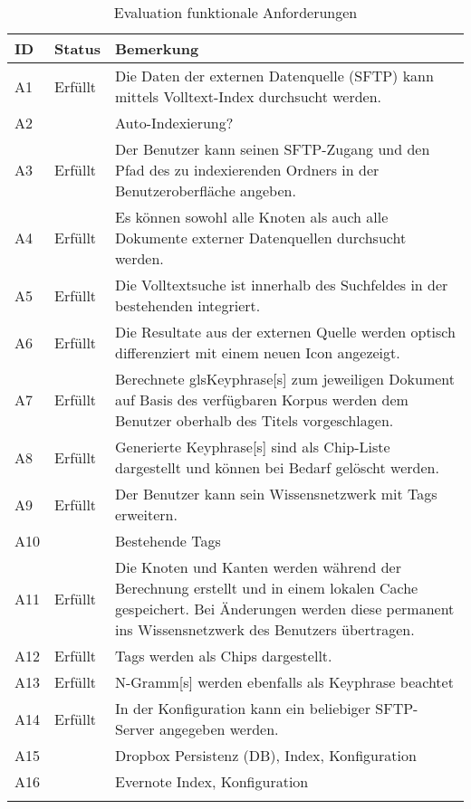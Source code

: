 \begin{longtable}{|p{1.5cm} | p{1.5cm} | p{8.1cm}|}
  \hline
    ID & Status & Bemerkung \\\hline
    A1 & Erfüllt & Die Daten der externen Datenquelle (\gls{SFTP}) kann mittels Volltext-Index durchsucht werden.\\\hline
    A2 &  & Auto-Indexierung?\\\hline
    A3 & Erfüllt & Der Benutzer kann seinen \gls{SFTP}-Zugang und den Pfad des zu indexierenden Ordners in der Benutzeroberfläche angeben. \\\hline
    A4 & Erfüllt & Es können sowohl alle Knoten als auch alle Dokumente externer Datenquellen durchsucht werden. \\\hline
    A5 & Erfüllt & Die Volltextsuche ist innerhalb des Suchfeldes in der bestehenden integriert. \\\hline
    A6 & Erfüllt & Die Resultate aus der externen Quelle werden optisch differenziert mit einem neuen Icon angezeigt. \\\hline
    A7 & Erfüllt & Berechnete gls{Keyphrase}[s] zum jeweiligen Dokument auf Basis des verfügbaren Korpus werden dem Benutzer oberhalb des Titels vorgeschlagen. \\\hline
    A8 & Erfüllt & Generierte \gls{Keyphrase}[s] sind als Chip-Liste dargestellt und können bei Bedarf gelöscht werden.\\\hline
    A9 & Erfüllt & Der Benutzer kann sein Wissensnetzwerk mit Tags erweitern.\\\hline
    A10 &  & Bestehende Tags\\\hline
    A11 & Erfüllt & Die Knoten und Kanten werden während der Berechnung erstellt und in einem lokalen Cache gespeichert. Bei Änderungen werden diese permanent ins Wissensnetzwerk des Benutzers übertragen.\\\hline
    A12 & Erfüllt & Tags werden als Chips dargestellt.\\\hline
    A13 & Erfüllt & \gls{N-Gramm}[s] werden ebenfalls als \gls{Keyphrase} beachtet\\\hline
    A14 & Erfüllt & In der Konfiguration kann ein beliebiger \gls{SFTP}-Server angegeben werden.  \\\hline
    A15 &  & Dropbox Persistenz (DB), Index, Konfiguration\\\hline
    A16 &  & Evernote Index, Konfiguration\\\hline
    \caption{Evaluation funktionale Anforderungen}
  \label{tab:funktionale-anforderungen-eval}
\end{longtable}


